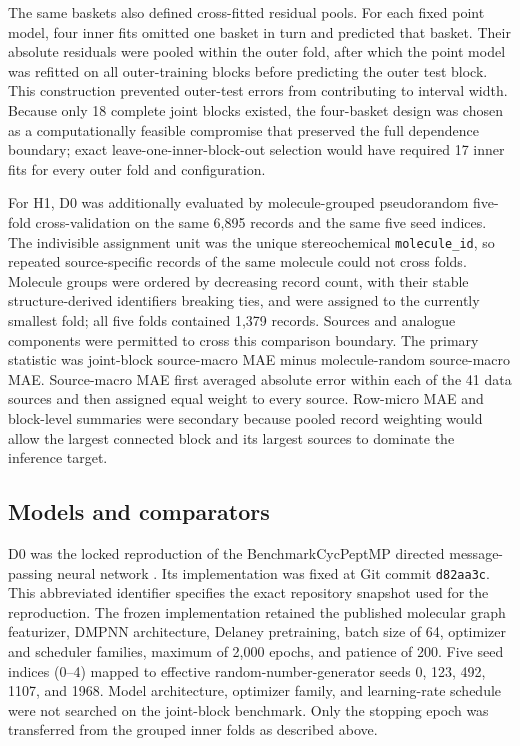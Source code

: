 \documentclass[referee,lineno,pdflatex,sn-vancouver-num]{sn-jnl}
\begin{document}
The same baskets also defined cross-fitted residual pools. For each fixed point model, four inner fits omitted one basket in turn and predicted that basket. Their absolute residuals were pooled within the outer fold, after which the point model was refitted on all outer-training blocks before predicting the outer test block. This construction prevented outer-test errors from contributing to interval width. Because only 18 complete joint blocks existed, the four-basket design was chosen as a computationally feasible compromise that preserved the full dependence boundary; exact leave-one-inner-block-out selection would have required 17 inner fits for every outer fold and configuration.

For H1, D0 was additionally evaluated by molecule-grouped pseudorandom five-fold cross-validation on the same 6,895 records and the same five seed indices. The indivisible assignment unit was the unique stereochemical \texttt{molecule\_id}, so repeated source-specific records of the same molecule could not cross folds. Molecule groups were ordered by decreasing record count, with their stable structure-derived identifiers breaking ties, and were assigned to the currently smallest fold; all five folds contained 1,379 records. Sources and analogue components were permitted to cross this comparison boundary. The primary statistic was joint-block source-macro MAE minus molecule-random source-macro MAE. Source-macro MAE first averaged absolute error within each of the 41 data sources and then assigned equal weight to every source. Row-micro MAE and block-level summaries were secondary because pooled record weighting would allow the largest connected block and its largest sources to dominate the inference target.

\subsection{Models and comparators}

D0 was the locked reproduction of the BenchmarkCycPeptMP directed message-passing neural network \cite{liu2025benchmark}. Its implementation was fixed at Git commit \texttt{d82aa3c}. This abbreviated identifier specifies the exact repository snapshot used for the reproduction. The frozen implementation retained the published molecular graph featurizer, DMPNN architecture, Delaney pretraining, batch size of 64, optimizer and scheduler families, maximum of 2,000 epochs, and patience of 200. Five seed indices (0--4) mapped to effective random-number-generator seeds 0, 123, 492, 1107, and 1968. Model architecture, optimizer family, and learning-rate schedule were not searched on the joint-block benchmark. Only the stopping epoch was transferred from the grouped inner folds as described above.
\end{document}
